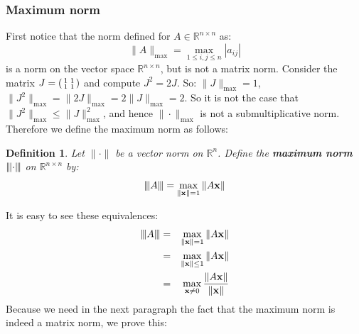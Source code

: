 \documentclass[a4paper,11pt]{report}
\newtheorem{definition}[theorem]{Definition}
\newcommand{\maxnorm}[1]{{\left\vert\kern-0.25ex\left\vert\kern-0.25ex\left\vert #1 
    \right\vert\kern-0.25ex\right\vert\kern-0.25ex\right\vert}}
\newcommand{\R}{{\mathbb R}}
\begin{document}
\subsubsection{Maximum norm}
First notice that the norm defined for $A \in \R^{n\times n}$ as:
$$\|A\|_{\max} = \max_{1\leq i, j \leq n} |a_{ij}|$$
is a norm on the vector space $\R^{n\times n}$, but is not a matrix norm. Consider the
matrix $J = \begin{psmallmatrix}1 & 1\\ 1 & 1\end{psmallmatrix}$ and compute $J^2 = 2J$. So:
$\|J\|_{\max} = 1$, $\|J^2\|_{\max} = \|2J\|_{\max} = 2\|J\|_{\max} = 2$. So it is not the case that $\|J^2\|_{\max} \leq \|J\|_{\max}^2$, and hence
$\|\cdot\|_{\max}$ is not a submultiplicative norm. Therefore we define the 
maximum norm as follows:
\begin{definition}
  Let $\|\cdot\|$ be a vector norm on $\R^n$. Define the \textbf{maximum norm} $\maxnorm{\cdot}$ on 
  $\R^{n\times n}$ by:
  $$\maxnorm{A} = \max_{\|\mathbf{x}\| = 1} \|A\mathbf{x}\|$$
  \end{definition}
It is easy to see these equivalences:
\begin{eqnarray*}
\maxnorm{A} &=& \max_{\|\mathbf{x}\|= 1} \|A\mathbf{x}\|\\
&=& \max_{\|\mathbf{x}\| \leq 1} \|A\mathbf{x}\|\\
  &=& \max_{\mathbf{x}\not = 0} \frac{\|A\mathbf{x}\|}{\|\mathbf{x}\|}\\
\end{eqnarray*}
Because we need in the next paragraph the fact that the maximum norm is indeed a 
matrix norm, we prove this:
\end{document}
